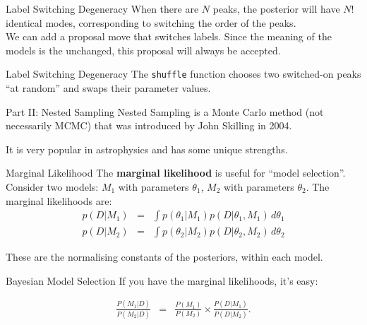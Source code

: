 \begin{frame}[t]{Label Switching Degeneracy}
When there are $N$ peaks, the posterior will have $N!$ identical modes,
corresponding to switching the order of the peaks.\\

\vspace{20pt}
We can add a proposal move that switches labels. Since the meaning of the
models is the unchanged, this proposal will always be accepted. 
\end{frame}


\begin{frame}[t]{Label Switching Degeneracy}
The {\tt shuffle} function chooses two switched-on peaks ``at random''
and swaps their parameter values.
\end{frame}



\begin{frame}[t]{Part II: Nested Sampling}
Nested Sampling is a Monte Carlo method (not necessarily MCMC) that was
introduced by John Skilling in 2004.

It is very popular in astrophysics and has some unique strengths.
\end{frame}


\begin{frame}[t]{Marginal Likelihood}
The {\bf marginal likelihood} is useful for ``model selection''. Consider
two models: $M_1$ with parameters $\theta_1$, $M_2$ with parameters $\theta_2$.
The marginal likelihoods are:
\begin{eqnarray*}
p(D | M_1) &=& \int p(\theta_1 | M_1) p(D | \theta_1, M_1) \, d\theta_1\\
p(D | M_2) &=& \int p(\theta_2 | M_2) p(D | \theta_2, M_2) \, d\theta_2
\end{eqnarray*}

These are the normalising constants of the posteriors, within each model.
\end{frame}



\begin{frame}[t]{Bayesian Model Selection}
If you have the marginal likelihoods, it's easy:

\begin{eqnarray*}
\frac{P(M_1 | D)}{P(M_2 | D)} &=& \frac{P(M_1)}{P(M_2)}
\times \frac{P(D | M_1)}{P(D | M_2)}.
\end{eqnarray*}
\end{frame}


